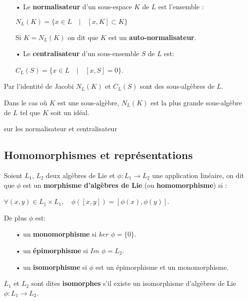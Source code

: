 \documentclass[a4paper,openany,12pt]{report}
\theoremstyle{break}
{\theorembodyfont{\upshape}
\newtheorem*{rmq}{Remarque :}
\newtheorem*{prv}{Preuve :}
\newtheorem*{ex}{Exemples :}
\newtheorem{exe}{Exemple : }
\newtheorem*{nota}{Notation :}}
\begin{document}
\begin{df}
\begin{itemize}

\item[•] Le \textbf{normalisateur} d'un sous-espace $K$ de $L$ est l'ensemble : 
 \begin{center}
$ N_{L}(K)=\{x \in L \quad |\quad [x,K] \subset K \} $ 
 \end{center}
Si $K = N_{L}(K)$ on dit que $K$ est un \textbf{auto-normalisateur}.

\item[•] Le \textbf{centralisateur} d'un sous-ensemble $S$ de $L$ est:
\begin{center}
$C_{L}(S) = \{x \in L\quad  | \quad [x,S]=0\}$.

\end{center} 
\end{itemize}
\end{df}

\begin{rmq} 
\quad Par l’identité de Jacobi $N_L(K)$ et $C_L(S)$ sont des sous-algèbres de $L$.

Dans le cas où $K$ est une sous-algèbre, $N_{L}(K)$ est la plus grande sous-algèbre de $L$ tel que $K$ soit un idéal.
\end{rmq}

\begin{exe}
sur les normalisateur et centralisateur
\end{exe}

\subsection{Homomorphismes et représentations}

\begin{df}
Soient $L_{1}$, $L_{2}$ deux algèbres de Lie et $\phi: L_{1} \rightarrow L_{2}$ une application linéaire, on dit que $\phi$ est un \textbf{morphisme d'algèbres de Lie} (ou \textbf{homomorphisme}) si :
\begin{center}
$ \forall(x, y) \in L_{1} \times L_{1}, \quad \phi([x, y])=[\phi(x), \phi(y)]$.
\end{center}
De plus $\phi$ est:
\begin{itemize}
\item[•] un \textbf{monomorphisme} si $ker$ $\phi = \{ 0 \}$.
\item[•] un \textbf{épimorphisme} si $Im$ $\phi = L_{2}$.
\item[•] un \textbf{isomorphisme} si $\phi$ est un épimorphisme et un monomorphisme.
\end{itemize}
$L_{1}$ et $L_{2}$ sont dites \textbf{isomorphes} s'il existe un isomorphisme d'algèbres de Lie $\phi: L_{1} \rightarrow L_{2}$.  
\end{df}
\end{document}
